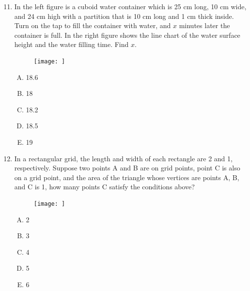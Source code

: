 \documentclass[12pt]{scrartcl}
\begin{document}
\begin{enumerate}\setcounter{enumi}{10}
    \item In the left figure is a cuboid water container which is 25 cm long, 10 cm wide, and 24 cm high with a partition that is 10 cm long and 1 cm thick inside. Turn on the tap to fill the container with water, and $x$ minutes later the container is full. In the right figure shows the line chart of the water surface height and the water filling time. Find $x$.
    \begin{figure}[h]
        \centering
        \texttt{[image: ]}
    \end{figure}
    \begin{multicols}{5}
        \begin{enumerate}[(A)]
            \item 18.6
            \item 18
            \item 18.2
            \item 18.5
            \item 19
        \end{enumerate}
    \end{multicols}

    \item In a rectangular grid, the length and width of each rectangle are 2 and 1, respectively. Suppose two points A and B are on grid points, point C is also on a grid point, and the area of the triangle whose vertices are points A, B, and C is 1, how many points C satisfy the conditions above?
    \begin{figure}[h]
        \centering
        \texttt{[image: ]}
    \end{figure}
    \begin{multicols}{5}
        \begin{enumerate}[(A)]
            \item 2
            \item 3
            \item 4
            \item 5
            \item 6
        \end{enumerate}
    \end{multicols}


\end{enumerate}
\end{document}
